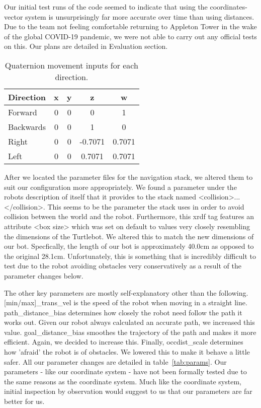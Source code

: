 \documentclass{article}
\begin{document}
Our initial test runs of the code seemed to indicate that using the coordinates-vector system is unsurprisingly far more accurate over time than using distances. Due to the team not feeling comfortable returning to Appleton Tower in the wake of the global COVID-19 pandemic, we were not able to carry out any official tests on this. Our plans are detailed in Evaluation section.

\begin{table}[h]
\vskip 3mm
\begin{center}
\begin{small}
\begin{sc}
\begin{tabular}{lcccc}
\hline
\abovespace\belowspace
Direction & x & y & z & w \\
\hline
  Forward & 0 & 0 & 0 & 1\\
  Backwards & 0 & 0 & 1 & 0 \\
  Right & 0 & 0 & -0.7071 & 0.7071 \\
  Left & 0 & 0 & 0.7071 & 0.7071 
\end{tabular}
\end{sc}
\end{small}
\caption{Quaternion movement inputs for each direction.}
\label{tab:quaternions}
\end{center}
\vskip -3mm
\end{table}

After we located the parameter files for the navigation stack, we altered them to suit our configuration more appropriately. We found a parameter under the robots description of itself that it provides to the stack named <collision>...</collision>. This seems to be the parameter the stack uses in order to avoid collision between the world and the robot. Furthermore, this xrdf tag features an attribute <box size> which was set on default to values very closely resembling the dimensions of the Turtlebot. We altered this to match the new dimensions of our bot. Specfically, the length of our bot is approximately 40.0cm as opposed to the original 28.1cm. Unfortunately, this is something that is incredibly difficult to test due to the robot avoiding obstacles very conservatively as a result of the parameter changes below.

The other key parameters are mostly self-explanatory other than the following. [min/max]\_trans\_vel is the speed of the robot when moving in a straight line. path\_distance\_bias determines how closely the robot need follow the path it works out. Given our robot always calculated an accurate path, we increased this value. goal\_distance\_bias smoothes the trajectory of the path and makes it more efficient. Again, we decided to increase this. Finally, occdist\_scale determines how 'afraid' the robot is of obstacles. We lowered this to make it behave a little safer. All our parameter changes are detailed in table~\ref{tab:params}. Our parameters - like our coordinate system - have not been formally tested due to the same reasons as the coordinate system. Much like the coordinate system, initial inspection by observation would suggest to us that our parameters are far better for us.
\end{document}
